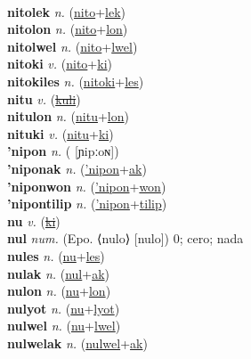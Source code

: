  \label{nitoam} \\
\textbf{nitolek} \textit{n.} (\hyperref[nito]{nito}+\hyperref[lek]{lek})
 \label{nitolek} \\
\textbf{nitolon} \textit{n.} (\hyperref[nito]{nito}+\hyperref[lon]{lon})
 \label{nitolon} \\
\textbf{nitolwel} \textit{n.} (\hyperref[nito]{nito}+\hyperref[lwel]{lwel})
 \label{nitolwel} \\
\textbf{nitoki} \textit{v.} (\hyperref[nito]{nito}+\hyperref[ki]{ki})
 \label{nitoki} \\
\textbf{nitokiles} \textit{n.} (\hyperref[nitoki]{nitoki}+\hyperref[les]{les})
 \label{nitokiles} \\
\textbf{nitu} \textit{v.} (\hyperref[kuli]{\sout{kuli}})
 \label{nitu} \\
\textbf{nitulon} \textit{n.} (\hyperref[nitu]{nitu}+\hyperref[lon]{lon})
 \label{nitulon} \\
\textbf{nituki} \textit{v.} (\hyperref[nitu]{nitu}+\hyperref[ki]{ki})
 \label{nituki} \\
\textbf{'nipon} \textit{n.} ( [ɲipːoɴ])
 \label{'nipon} \\
\textbf{'niponak} \textit{n.} (\hyperref['nipon]{'nipon}+\hyperref[ak]{ak})
 \label{'niponak} \\
\textbf{'niponwon} \textit{n.} (\hyperref['nipon]{'nipon}+\hyperref[won]{won})
 \label{'niponwon} \\
\textbf{'nipontilip} \textit{n.} (\hyperref['nipon]{'nipon}+\hyperref[tilip]{tilip})
 \label{'nipontilip} \\
\textbf{nu} \textit{v.} (\hyperref[ki]{\sout{ki}})
 \label{nu} \\
\textbf{nul} \textit{num.} (Epo. ⟨nulo⟩ [nulo])
0; cero; nada \label{nul} \\
\textbf{nules} \textit{n.} (\hyperref[nu]{nu}+\hyperref[les]{les})
 \label{nules} \\
\textbf{nulak} \textit{n.} (\hyperref[nul]{nul}+\hyperref[ak]{ak})
 \label{nulak} \\
\textbf{nulon} \textit{n.} (\hyperref[nu]{nu}+\hyperref[lon]{lon})
 \label{nulon} \\
\textbf{nulyot} \textit{n.} (\hyperref[nu]{nu}+\hyperref[lyot]{lyot})
 \label{nulyot} \\
\textbf{nulwel} \textit{n.} (\hyperref[nu]{nu}+\hyperref[lwel]{lwel})
 \label{nulwel} \\
\textbf{nulwelak} \textit{n.} (\hyperref[nulwel]{nulwel}+\hyperref[ak]{ak})
 \label{nulwelak} \\
